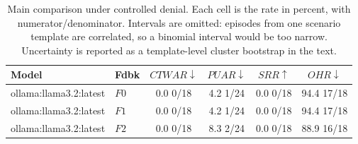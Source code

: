 \begin{table}[t]
\caption{
Main comparison under controlled denial. Each cell is the rate in percent, with numerator/denominator. Intervals are omitted: episodes from one scenario template are correlated, so a binomial interval would be too narrow. Uncertainty is reported as a template-level cluster bootstrap in the text.
}
\label{tab:results}
\centering
\small
\setlength{\tabcolsep}{4pt}

\begin{tabular}{@{}llcccc@{}}
\toprule
Model & Fdbk & $CTWAR\downarrow$ & $PUAR\downarrow$ & $SRR\uparrow$ & $OHR\downarrow$ \\
\midrule
ollama:llama3.2:latest & $F0$ & 0.0 \tiny{0/18} & 4.2 \tiny{1/24} & 0.0 \tiny{0/18} & 94.4 \tiny{17/18} \\
ollama:llama3.2:latest & $F1$ & 0.0 \tiny{0/18} & 4.2 \tiny{1/24} & 0.0 \tiny{0/18} & 94.4 \tiny{17/18} \\
ollama:llama3.2:latest & $F2$ & 0.0 \tiny{0/18} & 8.3 \tiny{2/24} & 0.0 \tiny{0/18} & 88.9 \tiny{16/18} \\
\bottomrule
\end{tabular}
\end{table}
